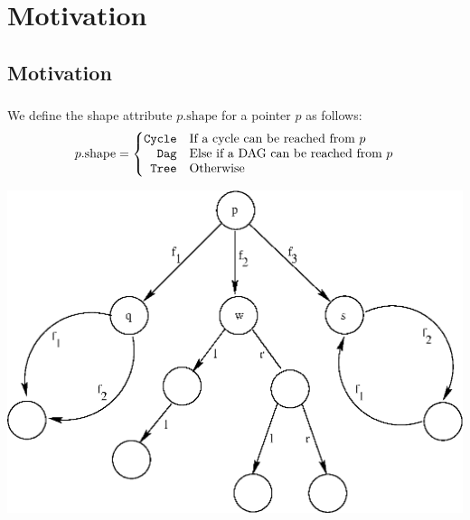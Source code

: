\documentclass[mathserif,10pt]{beamer}
\newcommand{\cmt}[1]{}
\newcommand{\Tree}{{\tt Tree}}
\newcommand{\Dag}{{\tt Dag}}
\newcommand{\Cycle}{{\tt Cycle}}
\newcommand{\p}{\ensuremath{p}}
\newcommand{\shape}{\mbox{shape}}
\begin{document}
\section{Motivation}
\subsection{Motivation}
\frame
{
	\frametitle{\subsecname}

	\cmt{For each pointer variable, our analysis computes the shape
attribute of the data structure pointed to by the variable.} 
We define the shape attribute $\p.\shape$
for a pointer $\p$ as follows:
\begin{eqnarray*}
  \p.\shape = \left\{ \begin{array}{@{}rl@{}}
    \Cycle & \mbox{If a cycle can be reached from $\p$} \\ 
    \Dag & \mbox{Else if a DAG can be reached from $\p$} \\
    \Tree & \mbox{Otherwise} \\
  \end{array} \right.
\end{eqnarray*}
	\begin{center}
      \includegraphics[scale=0.6]{Figure/figure_1}
	\end{center}
\cmt{
where the heap is visualized as a directed graph, and cycle
and DAG have there natural graph-theoretic meanings.	}
}
\end{document}
